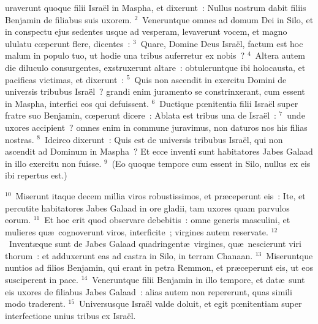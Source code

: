 \bchapter
{}uraverunt quoque filii Isra\"el in Maspha, et dixerunt~: Nullus nostrum dabit filiis Benjamin de filiabus suis uxorem.
${}^{2}$~Veneruntque omnes ad domum Dei in Silo, et in conspectu ejus sedentes usque ad vesperam, levaverunt vocem, et magno ululatu cœperunt flere, dicentes~:
${}^{3}$~Quare, Domine Deus Isra\"el, factum est hoc malum in populo tuo, ut hodie una tribus auferretur ex nobis~?
${}^{4}$~Altera autem die diluculo consurgentes, exstruxerunt altare~: obtuleruntque ibi holocausta, et pacificas victimas, et dixerunt~:
${}^{5}$~Quis non ascendit in exercitu Domini de universis tribubus Isra\"el~? grandi enim juramento se constrinxerant, cum essent in Maspha, interfici eos qui defuissent.
${}^{6}$~Ductique pœnitentia filii Isra\"el super fratre suo Benjamin, cœperunt dicere~: Ablata est tribus una de Isra\"el~:
${}^{7}$~unde uxores accipient~? omnes enim in commune juravimus, non daturos nos his filias nostras.
${}^{8}$~Idcirco dixerunt~: Quis est de universis tribubus Isra\"el, qui non ascendit ad Dominum in Maspha~? Et ecce inventi sunt habitatores Jabes Galaad in illo exercitu non fuisse.
${}^{9}$~(Eo quoque tempore cum essent in Silo, nullus ex eis ibi repertus est.)


${}^{10}$~Miserunt itaque decem millia viros robustissimos, et pr\ae ceperunt eis~: Ite, et percutite habitatores Jabes Galaad in ore gladii, tam uxores quam parvulos eorum.
${}^{11}$~Et hoc erit quod observare debebitis~: omne generis masculini, et mulieres qu\ae\ cognoverunt viros, interficite~; virgines autem reservate.
${}^{12}$~Invent\ae que sunt de Jabes Galaad quadringent\ae\ virgines, qu\ae\ nescierunt viri thorum~: et adduxerunt eas ad castra in Silo, in terram Chanaan.
${}^{13}$~Miseruntque nuntios ad filios Benjamin, qui erant in petra Remmon, et pr\ae ceperunt eis, ut eos susciperent in pace.
${}^{14}$~Veneruntque filii Benjamin in illo tempore, et dat\ae\ sunt eis uxores de filiabus Jabes Galaad~: alias autem non repererunt, quas simili modo traderent.
${}^{15}$~Universusque Isra\"el valde doluit, et egit pœnitentiam super interfectione unius tribus ex Isra\"el.


